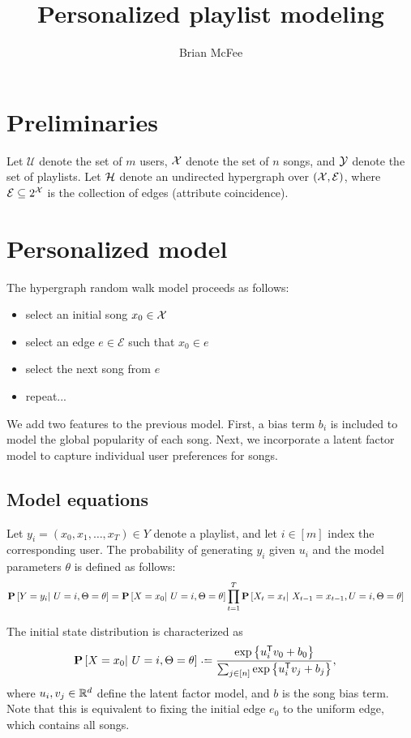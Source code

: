 \documentclass{article}
\title{Personalized playlist modeling}
\author{Brian McFee}
\def\U{\ensuremath{\mathcal{U}}}
\begin{document}
\maketitle

\section{Preliminaries}

Let $\U$ denote the set of $m$ users, $\mathcal{X}$ denote the set of $n$ songs, and $\mathcal{Y}$ denote the set of playlists.
Let $\mathcal{H}$ denote an undirected hypergraph over $(\mathcal{X}, \mathcal{E})$, where $\mathcal{E} \subseteq 2^{\mathcal{X}}$ is the
collection of edges (attribute coincidence).

\section{Personalized model}

The hypergraph random walk model proceeds as follows:
\begin{itemize}
\item select an initial song $x_0 \in \mathcal{X}$
\item select an edge $e \in \mathcal{E}$ such that $x_0 \in e$
\item select the next song from $e$
\item repeat...
\end{itemize}

We add two features to the previous model.  First, a bias term $b_i$ is included to model the global popularity of each
song.  Next, we incorporate a latent factor model to capture individual user preferences for songs.

\subsection{Model equations}

Let $y_i = (x_0, x_1, \dots, x_T) \in Y$ denote a playlist, and let $i \in [m]$ index the corresponding user.
The probability of generating $y_i$ given $u_i$ and the model parameters $\theta$ is defined as follows:
\begin{align*}
\mathbf{P}\left[Y = y_i |~ U = i, \Theta = \theta \right] &= \mathbf{P}\left[X = x_0 |~ U = i, \Theta = \theta\right]
\prod_{t=1}^{T} \mathbf{P}\left[X_t = x_t |~ X_{t-1}=x_{t-1}, U=i, \Theta=\theta \right]
\end{align*}

The initial state distribution is characterized as
\begin{align*}
\P\left[X = x_0 \given U = i, \Theta = \theta\right] &\defeq 
\frac{\exp\left\{u_i\trans v_0 + b_0\right\}}{\sum_{j \in [n]} \exp\left\{u_i\trans v_j + b_j\right\}},
\end{align*}
where $u_i, v_j \in \mathbb{R}^{d}$ define the latent factor model, and $b$ is the song bias term.  Note that this is
equivalent to fixing the initial edge $e_0$ to the uniform edge, which contains all songs.
\end{document}
